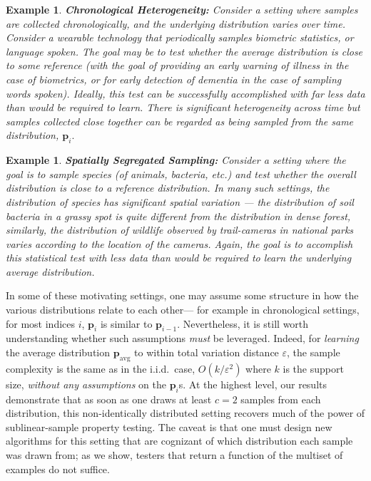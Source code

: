\documentclass[10pt]{article} %
\def\eps{{\varepsilon}}
\theoremstyle{plain}
\newtheorem{example}[theorem]{Example}
\newcommand{\bp}{\textbf{p}}
\newcommand{\avg}{\mathrm{avg}}
\begin{document}
\begin{example}
	\textbf{Chronological Heterogeneity:} Consider a setting where samples are collected chronologically, and the underlying distribution varies over time.  Consider a wearable technology that periodically samples biometric statistics, or language spoken.  The goal may be to test whether the average distribution is close to some reference (with the goal of providing an early warning of illness in the case of biometrics, or for early detection of dementia in the case of sampling words spoken). Ideally, this test can be successfully accomplished with far less data than would be required to \emph{learn}.  There is significant heterogeneity across time but samples collected close together can be regarded as being sampled from the same distribution, $\bp_i.$
\end{example}

\begin{example}
	\textbf{Spatially Segregated Sampling:}  Consider a setting where the goal is to sample species (of animals, bacteria, etc.) and test whether the overall distribution is close to a reference distribution.  In many such settings, the distribution of species has significant spatial variation --- the distribution of soil bacteria in a grassy spot is quite different from the distribution in dense forest, similarly, the distribution of wildlife observed by trail-cameras in national parks varies according to the location of the cameras. Again, the goal is to accomplish this statistical test with less data than would be required to learn the underlying average distribution.    
\end{example}

In some of these motivating settings, one may assume some structure in how the various distributions relate to each other--- for example in chronological settings, for most indices $i$, $\bp_i$ is similar to $\bp_{i-1}.$  Nevertheless, it is still worth understanding whether such assumptions \emph{must} be leveraged.  Indeed, for \emph{learning} the average distribution $\bp_{\avg}$ to within total variation distance $\eps$, the sample complexity is the same as in the i.i.d.\ case, $O(k/\eps^2)$ where $k$ is the support size, \textit{without any assumptions} on the $\bp_i$s.  At the highest level, our results demonstrate that as soon as one draws at least $c=2$ samples from each distribution, this non-identically distributed setting recovers much of the power of sublinear-sample property testing.  The caveat is that one must design new algorithms for this setting that are cognizant of which distribution each sample was drawn from; as we show, testers that return a function of the multiset of examples do not suffice. %
\end{document}
